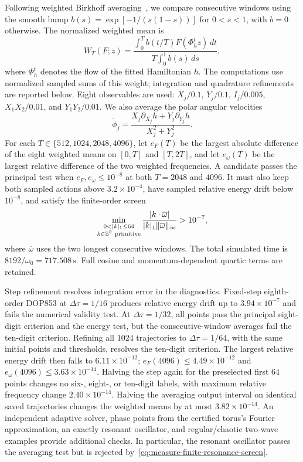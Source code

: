 Following weighted Birkhoff averaging~\citep{das2017quasiperiodicity,duignan2023flows},
we compare consecutive windows using the smooth bump
$b(s)=\exp[-1/(s(1-s))]$ for $0<s<1$, with $b=0$ otherwise.
The normalized weighted mean is
\begin{equation}
 W_T(F;z)=\frac{\int_0^T b(t/T)F(\Phi_h^t z)\,dt}
                      {T\int_0^1 b(s)\,ds},
 \label{eq:measure-weighted-average}
\end{equation}
where $\Phi_h^t$ denotes the flow of the fitted Hamiltonian $h$.
The computations use normalized sampled sums of this weight; integration
and quadrature refinements are reported below.
Eight observables are used:
$X_j/0.1$, $Y_j/0.1$, $I_j/0.005$, $X_1X_2/0.01$, and $Y_1Y_2/0.01$.
We also average the polar angular velocities
\begin{equation}
 \dot\phi_j=
 \frac{X_j\partial_{X_j}h+
       Y_j\partial_{Y_j}h}{X_j^2+Y_j^2}.
 \label{eq:measure-angular-frequency}
\end{equation}
For each $T\in\{512,1024,2048,4096\}$, let $e_F(T)$ be the largest
absolute difference of the eight weighted means on $[0,T]$ and $[T,2T]$,
and let $e_\omega(T)$ be the largest relative difference of the two
weighted frequencies. A candidate passes the principal test when
$e_F,e_\omega\le10^{-8}$ at both $T=2048$ and $4096$.
It must also keep both sampled actions above $3.2\times10^{-4}$, have sampled
relative energy drift below $10^{-8}$, and satisfy the finite-order screen
\begin{equation}
 \min_{\substack{0<|k|_1\le64\\k\in\mathbb Z^2\ {\rm primitive}}}
 \frac{|k\cdot\overline\omega|}{|k|_1\|\overline\omega\|_\infty}
 >10^{-7},
 \label{eq:measure-finite-resonance-screen}
\end{equation}
where $\overline\omega$ uses the two longest consecutive windows.
The total simulated time is $8192/\omega_0=717.508\,\mathrm{s}$.
Full cosine and momentum-dependent quartic terms are retained.

Step refinement resolves integration error in the diagnostics. Fixed-step eighth-order DOP853
at $\Delta\tau=1/16$ produces relative energy drift up to $3.94\times10^{-7}$ and
fails the numerical validity test. At $\Delta\tau=1/32$, all points pass the principal
eight-digit criterion and the energy test, but the consecutive-window
averages fail the ten-digit criterion.
Refining all $1024$ trajectories to $\Delta\tau=1/64$, with the same initial
points and thresholds, resolves the ten-digit criterion.
The largest relative energy drift then falls to $6.11\times10^{-12}$;
$e_F(4096)\le4.49\times10^{-12}$ and
$e_\omega(4096)\le3.63\times10^{-14}$.
Halving the step again for the preselected first $64$ points changes no
six-, eight-, or ten-digit labels, with maximum relative frequency change
$2.40\times10^{-14}$. Halving the averaging output interval on identical
saved trajectories changes the weighted means by at most $3.82\times10^{-14}$.
An independent adaptive solver, phase points from the certified torus's
Fourier approximation, an exactly
resonant oscillator, and regular/chaotic two-wave examples provide additional
checks. In particular, the resonant oscillator passes the averaging test but
is rejected by~\eqref{eq:measure-finite-resonance-screen}.

